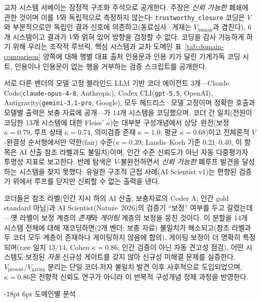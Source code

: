 \documentclass[11pt]{article}
\makeatletter
\renewcommand\section{\@startsection{section}{1}{\z@}%
  {-18pt \@plus -4pt \@minus -2pt}%
  {6pt \@plus 2pt}%
  {\normalfont\large\bfseries}}
\makeatother
\begin{document}
교차 시스템 서베이는 잠정적 구조화 주석으로 공개한다. 주장은 \emph{신뢰 가능한} 폐쇄에 관한 것이며 이를 $V$와 독립적으로 측정하지 않는다: \texttt{trustworthy\_closure} 코딩은 $V$와 부분적으로만 독립인 결과 신호에 의존하고(동료심사·게재는 $V_\text{human}$과 겹친다), 6개 시스템이고 결과가 $V$와 얽혀 있어 방향을 검정할 수 없다. 코딩을 감사 가능하게 하기 위해 우리는 조작적 루브릭, 핵심 시스템과 교차 도메인 표~\ref{tab:domain-comparison} 양쪽에 대해 행별 대표 출처 인용문과 인용 키가 달린 기계가독 코딩 시트, 인용이나 인용문이 없는 행을 거부하는 검증 스크립트를 공개한다.

서로 다른 벤더의 모델 고정 블라인드 LLM 기반 코더 에이전트 3개---Claude Code(\texttt{claude-opus-4-8}, Anthropic), Codex CLI(\texttt{gpt-5.5}, OpenAI), Antigravity(\texttt{gemini-3.1-pro}, Google), 모두 헤드리스·모델 고정이며 정확한 호출과 모델별 출력은 보충 자료에 공개---가 14개 시스템을 코딩했으며, 코더 간 일치(전원이 코딩한 13개 시스템에 대한 Fleiss' $\kappa$)는 대부분 구성개념에서 상당~완전(보정 $\kappa{=}0.79$, 루프 상태 $\kappa{=}0.74$, 의미검증 존재 $\kappa{=}1.0$; 평균 $\kappa{=}0.68$)이고 전체론적 $V$-완결성 순서형에서만 약한(fair) 수준($\kappa{=}0.39$; Landis--Koch 기준 0.21--0.40, 이 항목은 AI 산출 참조 라벨과도 불일치)이며, 인간 수준 신뢰도가 아닌 자동 다중평가자 투명성 지표로 보고한다. 반례 탐색은 $V$-불완전하면서 \emph{신뢰 가능한} 폐루프 발견을 달성하는 시스템을 찾지 못했다: 유일한 구조적 근접 사례(AI Scientist v1)는 편향된 검증기 위에서 루프를 닫지만 신뢰할 수 없는 출력을 낸다.

코더들은 참조 라벨(인간 지시 하의 AI 산출, 보충자료의 Coder A; 인간 gold standard 아님)과 AI Scientist(Nature~2026)의 검증기 ``보정'' 여부를 두고 갈렸는데---옛 라벨이 보정 계층의 \emph{존재}와 \emph{게이팅} 계층의 보정을 뭉친 것이다. 이 분할을 14개 시스템 전체에 대해 재코딩하면(2개 벤더; 보충 자료) 불일치가 해소되고(참조 라벨과 두 코더 모두 계층이 존재하나 게이팅하지 않음에 합의), 게이팅 보정이 더 명확히 특정되며(raw 일치 13/14, Cohen $\kappa{=}0.86$; 인간 검증이 아닌 자동 견고성 점검), 어떤 시스템도 보정된 \emph{자동} 신규성 게이트를 갖지 않아 신규성 미해결 문제를 실증한다. $V_\text{present}$/$V_\text{gating}$ 분리는 단일 코더-저자 불일치 발견 이후 사후적으로 도입되었으며, $\kappa{=}0.86$은 전향적 신뢰도 연구가 아니라 이 반복적 구성개념 정제 과정을 반영한다.

\section{도메인별 분석}
\label{app:domains}
\end{document}
